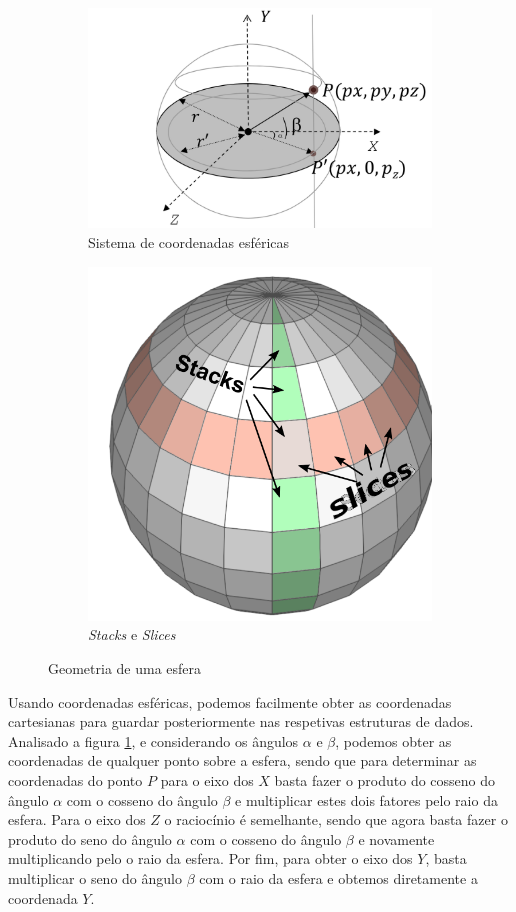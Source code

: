 \documentclass[a4paper, 11pt]{article}
\begin{document}
\begin{figure}[H]
\centering
\begin{subfigure}{.5\textwidth}
    \centering
    \includegraphics[width=\textwidth]{img/spherical.png}
    \caption{Sistema de coordenadas esféricas}
    \label{fig:coords}
\end{subfigure}%
\begin{subfigure}{.5\textwidth}
    \centering
    \includegraphics[width=.6\textwidth]{img/gl_sphere02.png}
    \caption{\textit{Stacks} e \textit{Slices}}
\end{subfigure}
\caption{Geometria de uma esfera}
\end{figure}

\pagebreak

Usando coordenadas esféricas, podemos facilmente obter as coordenadas cartesianas para guardar 
posteriormente nas respetivas estruturas de dados. Analisado a figura \ref{fig:coords}, e
considerando os ângulos $\alpha$ e  $\beta$, podemos obter as coordenadas de qualquer ponto sobre
a esfera, sendo que para determinar as coordenadas do ponto $P$ para o eixo dos $X$
basta fazer o produto do cosseno do ângulo $\alpha$ com o cosseno do ângulo $\beta$ e multiplicar 
estes dois fatores pelo raio da esfera. Para o eixo dos $Z$ o raciocínio é semelhante, 
sendo que agora basta fazer o produto do seno do ângulo $\alpha$ com o cosseno do ângulo 
$\beta$ e novamente multiplicando pelo o raio da esfera. Por fim, para obter o eixo dos $Y$, basta 
multiplicar o seno do ângulo $\beta$ com o raio da esfera e obtemos diretamente a coordenada $Y$.
\end{document}
